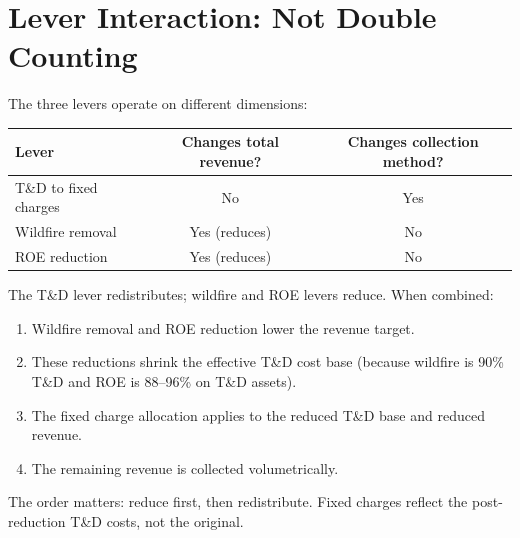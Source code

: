 \documentclass[11pt]{article}
\begin{document}
\section{Lever Interaction: Not Double Counting}

The three levers operate on different dimensions:

\begin{table}[htbp]
\centering
\begin{tabular}{l c c}
\toprule
\textbf{Lever} & \textbf{Changes total revenue?} & \textbf{Changes collection method?} \\
\midrule
T\&D to fixed charges & No & Yes \\
Wildfire removal & Yes (reduces) & No \\
ROE reduction & Yes (reduces) & No \\
\bottomrule
\end{tabular}
\end{table}

The T\&D lever redistributes; wildfire and ROE levers reduce. When combined:

\begin{enumerate}
\item Wildfire removal and ROE reduction lower the revenue target.
\item These reductions shrink the effective T\&D cost base (because wildfire is 90\% T\&D and ROE is 88--96\% on T\&D assets).
\item The fixed charge allocation applies to the reduced T\&D base and reduced revenue.
\item The remaining revenue is collected volumetrically.
\end{enumerate}

The order matters: reduce first, then redistribute. Fixed charges reflect the post-reduction T\&D costs, not the original.
\end{document}

